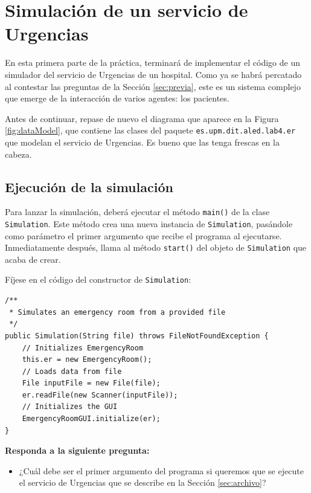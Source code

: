 \documentclass[10pt,a4paper,spanish]{article}
\newcommand{\code}[1]{\texttt{#1}}
\begin{document}
\section{Simulación de un servicio de Urgencias}
\label{sec:laboratorio}
\label{sec:simulacion}

En esta primera parte de la práctica, terminará de implementar el código de un simulador del servicio de Urgencias de un hospital. Como ya se habrá percatado al contestar las preguntas de la Sección \ref{sec:previa}, este es un sistema complejo que emerge de la interacción de varios agentes: los pacientes.

Antes de continuar, repase de nuevo el diagrama que aparece en la Figura \ref{fig:dataModel}, que contiene las clases del paquete \code{es.upm.dit.aled.lab4.er} que modelan el servicio de Urgencias. Es bueno que las tenga frescas en la cabeza.

\subsection{Ejecución de la simulación}

Para lanzar la simulación, deberá ejecutar el método \code{main()} de la clase \code{Simulation}. Este método crea una nueva instancia de \code{Simulation}, pasándole como parámetro el primer argumento que recibe el programa al ejecutarse. Inmediatamente después, llama al método \code{start()} del objeto de \code{Simulation} que acaba de crear.

Fíjese en el código del constructor de \code{Simulation}:

\begin{verbatim}
/**
 * Simulates an emergency room from a provided file
 */
public Simulation(String file) throws FileNotFoundException {
    // Initializes EmergencyRoom
    this.er = new EmergencyRoom();
    // Loads data from file
    File inputFile = new File(file);
    er.readFile(new Scanner(inputFile));
    // Initializes the GUI
    EmergencyRoomGUI.initialize(er);
}
\end{verbatim}

\textbf{Responda a la siguiente pregunta:}

\begin{itemize}
    \item ¿Cuál debe ser el primer argumento del programa si queremos que se ejecute el servicio de Urgencias que se describe en la Sección \ref{sec:archivo}?
\end{itemize}
\end{document}
